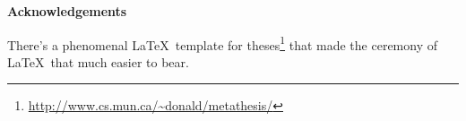 \begin{center}
\textbf{\large Acknowledgements}
\end{center}

There's a phenomenal \LaTeX\ template for theses\footnote{\url{http://www.cs.mun.ca/~donald/metathesis/}} that made the ceremony of \LaTeX\ that much easier to bear.

% 
% 
